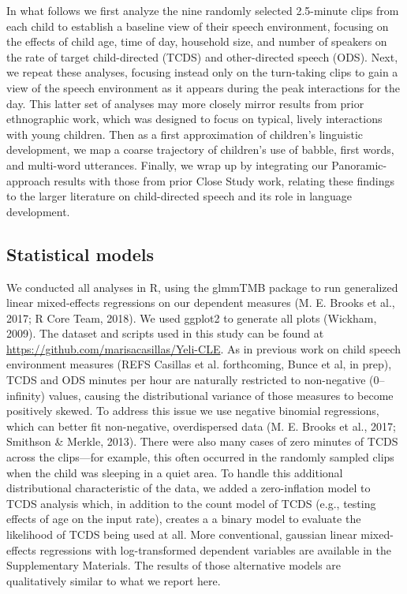 \documentclass[,man,floatsintext]{apa6}
\begin{document}
In what follows we first analyze the nine randomly selected 2.5-minute
clips from each child to establish a baseline view of their speech
environment, focusing on the effects of child age, time of day,
household size, and number of speakers on the rate of target
child-directed (TCDS) and other-directed speech (ODS). Next, we repeat
these analyses, focusing instead only on the turn-taking clips to gain a
view of the speech environment as it appears during the peak
interactions for the day. This latter set of analyses may more closely
mirror results from prior ethnographic work, which was designed to focus
on typical, lively interactions with young children. Then as a first
approximation of children's linguistic development, we map a coarse
trajectory of children's use of babble, first words, and multi-word
utterances. Finally, we wrap up by integrating our Panoramic-approach
results with those from prior Close Study work, relating these findings
to the larger literature on child-directed speech and its role in
language development.

\subsection{Statistical models}\label{statistical-models}

We conducted all analyses in R, using the glmmTMB package to run
generalized linear mixed-effects regressions on our dependent measures
(M. E. Brooks et al., 2017; R Core Team, 2018). We used ggplot2 to
generate all plots (Wickham, 2009). The dataset and scripts used in this
study can be found at \url{https://github.com/marisacasillas/Yeli-CLE}.
As in previous work on child speech environment measures (REFS Casillas
et al. forthcoming, Bunce et al, in prep), TCDS and ODS minutes per hour
are naturally restricted to non-negative (0--infinity) values, causing
the distributional variance of those measures to become positively
skewed. To address this issue we use negative binomial regressions,
which can better fit non-negative, overdispersed data (M. E. Brooks et
al., 2017; Smithson \& Merkle, 2013). There were also many cases of zero
minutes of TCDS across the clips---for example, this often occurred in
the randomly sampled clips when the child was sleeping in a quiet area.
To handle this additional distributional characteristic of the data, we
added a zero-inflation model to TCDS analysis which, in addition to the
count model of TCDS (e.g., testing effects of age on the input rate),
creates a a binary model to evaluate the likelihood of TCDS being used
at all. More conventional, gaussian linear mixed-effects regressions
with log-transformed dependent variables are available in the
Supplementary Materials. The results of those alternative models are
qualitatively similar to what we report here.
\end{document}
